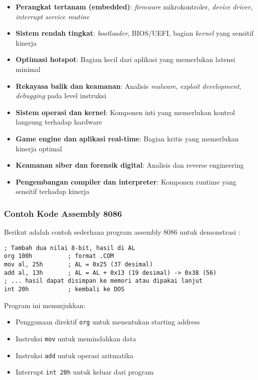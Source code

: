 \begin{itemize}
    \item \textbf{Perangkat tertanam (embedded)}: \textit{firmware} mikrokontroler, \textit{device driver}, \textit{interrupt service routine}
    \item \textbf{Sistem rendah tingkat}: \textit{bootloader}, BIOS/UEFI, bagian \textit{kernel} yang sensitif kinerja
    \item \textbf{Optimasi hotspot}: Bagian kecil dari aplikasi yang memerlukan latensi minimal
    \item \textbf{Rekayasa balik dan keamanan}: Analisis \textit{malware}, \textit{exploit development}, \textit{debugging} pada level instruksi
    \item \textbf{Sistem operasi dan kernel}: Komponen inti yang memerlukan kontrol langsung terhadap hardware
    \item \textbf{Game engine dan aplikasi real-time}: Bagian kritis yang memerlukan kinerja optimal
    \item \textbf{Keamanan siber dan forensik digital}: Analisis dan reverse engineering
    \item \textbf{Pengembangan compiler dan interpreter}: Komponen runtime yang sensitif terhadap kinerja
\end{itemize}

\subsubsection{Contoh Kode Assembly 8086}
Berikut adalah contoh sederhana program assembly 8086 untuk demonstrasi \cite{susanto1995belajar}:

\begin{lstlisting}[language={[x86masm]Assembler}, caption={Cuplikan 8086 (ilustratif)}, label={lst:assembly_example}]
; Tambah dua nilai 8-bit, hasil di AL
org 100h          ; format .COM
mov al, 25h       ; AL = 0x25 (37 desimal)
add al, 13h       ; AL = AL + 0x13 (19 desimal) -> 0x38 (56)
; ... hasil dapat disimpan ke memori atau dipakai lanjut
int 20h           ; kembali ke DOS
\end{lstlisting}

Program ini menunjukkan:
\begin{itemize}
    \item Penggunaan direktif \texttt{org} untuk menentukan starting address
    \item Instruksi \texttt{mov} untuk memindahkan data
    \item Instruksi \texttt{add} untuk operasi aritmatika
    \item Interrupt \texttt{int 20h} untuk keluar dari program
\end{itemize}

